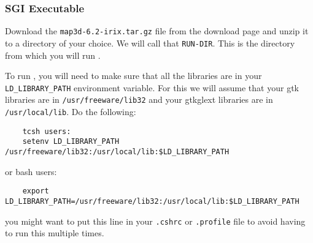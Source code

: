 \subsubsection{SGI Executable}

Download the \texttt{map3d-6.2-irix.tar.gz} file from the \map{} download
page and unzip it to a directory of your choice.  We will call that
\texttt{RUN-DIR}. This is the directory from which you will run \map{}.

To run \map{}, you will need to make sure that all the libraries are in
your \texttt{LD\_LIBRARY\_PATH} environment variable.  For this we will
assume that your gtk libraries are in \texttt{/usr/freeware/lib32} and your
gtkglext libraries are in \texttt{/usr/local/lib}.  Do the following:

\begin{verbatim}
    tcsh users:
    setenv LD_LIBRARY_PATH /usr/freeware/lib32:/usr/local/lib:$LD_LIBRARY_PATH
\end{verbatim}
%
or
%
bash users:
\begin{verbatim}
    export LD_LIBRARY_PATH=/usr/freeware/lib32:/usr/local/lib:$LD_LIBRARY_PATH
\end{verbatim}
%
you might want to put this line in your \texttt{.cshrc} or
\texttt{.profile} file to avoid having to run this multiple times.

